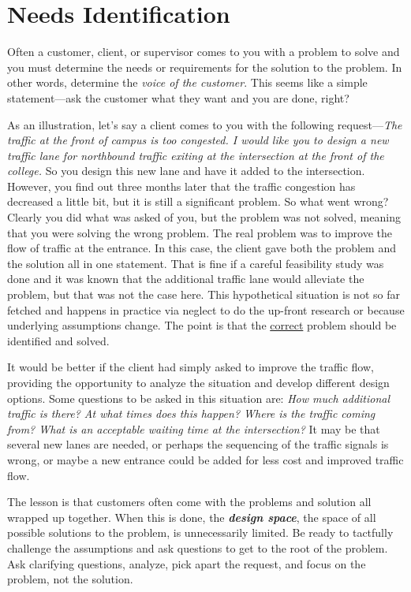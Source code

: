 \section{Needs Identification}
\label{section:needs-identification}

Often a customer, client, or supervisor comes to you with a problem to
solve and you must determine the needs or requirements for the solution
to the problem. In other words, determine the \emph{voice of the
customer}. This seems like a simple statement---ask the customer what
they want and you are done, right?

As an illustration, let's say a client comes to you with the following
request---\emph{The traffic at the front of campus is too congested. I
would like you to design a new traffic lane for northbound traffic
exiting at the intersection at the front of the college.} So you design
this new lane and have it added to the intersection. However, you find
out three months later that the traffic congestion has decreased a
little bit, but it is still a significant problem. So what went wrong?
Clearly you did what was asked of you, but the problem was not solved,
meaning that you were solving the wrong problem. The real problem was to
improve the flow of traffic at the entrance. In this case, the client
gave both the problem and the solution all in one statement. That is
fine if a careful feasibility study was done and it was known that the
additional traffic lane would alleviate the problem, but that was not
the case here. This hypothetical situation is not so far fetched and
happens in practice via neglect to do the up-front research or because
underlying assumptions change. The point is that the \ul{correct}
problem should be identified and solved.

It would be better if the client had simply asked to improve the traffic
flow, providing the opportunity to analyze the situation and develop
different design options. Some questions to be asked in this situation
are: \emph{How much additional traffic is there? At what times does this
happen? Where is the traffic coming from? What is an acceptable waiting
time at the intersection?} It may be that several new lanes are needed,
or perhaps the sequencing of the traffic signals is wrong, or maybe a
new entrance could be added for less cost and improved traffic flow.

The lesson is that customers often come with the problems and solution
all wrapped up together. When this is done, the \emph{\textbf{design
space}}, the space of all possible solutions to the problem, is
unnecessarily limited. Be ready to tactfully challenge the assumptions
and ask questions to get to the root of the problem. Ask clarifying
questions, analyze, pick apart the request, and focus on the problem,
not the solution.

